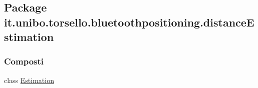 \hypertarget{namespaceit_1_1unibo_1_1torsello_1_1bluetoothpositioning_1_1distanceEstimation}{}\subsection{Package it.\+unibo.\+torsello.\+bluetoothpositioning.\+distance\+Estimation}
\label{namespaceit_1_1unibo_1_1torsello_1_1bluetoothpositioning_1_1distanceEstimation}
\subsubsection*{Composti}
\begin{DoxyCompactItemize}
\item 
class \hyperlink{classit_1_1unibo_1_1torsello_1_1bluetoothpositioning_1_1distanceEstimation_1_1Estimation}{Estimation}
\end{DoxyCompactItemize}
